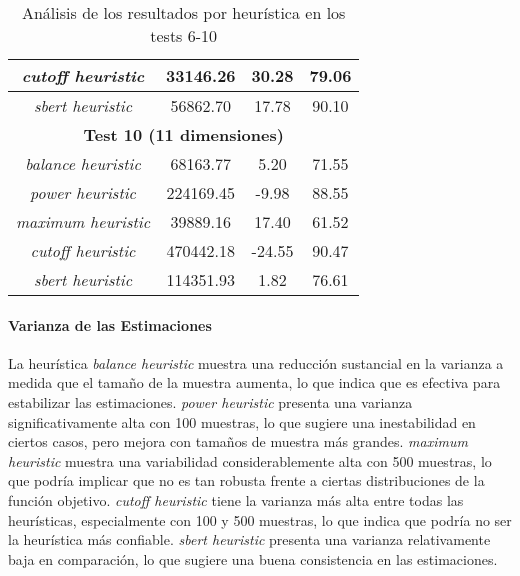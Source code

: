 \documentclass{article}
\begin{document}
\begin{table}[H]
{\begin{tabular}{|c|c|c|c|}
\textit{cutoff heuristic} & 33146.26 & 30.28 & 79.06 \\ \hline
\textit{sbert heuristic} & 56862.70 & 17.78 & 90.10 \\ \hline
\multicolumn{4}{|c|}{\textbf{Test 10 (11 dimensiones)}} \\ \hline
\textit{balance heuristic} & 68163.77 & 5.20 & 71.55 \\ \hline
\textit{power heuristic} & 224169.45 & -9.98 & 88.55 \\ \hline
\textit{maximum heuristic} & 39889.16 & 17.40 & 61.52 \\ \hline
\textit{cutoff heuristic} & 470442.18 & -24.55 & 90.47 \\ \hline
\textit{sbert heuristic} & 114351.93 & 1.82 & 76.61 \\ \hline
\end{tabular}%
}
\caption{Análisis de los resultados por heurística en los tests 6-10}
\end{table}

\begin{table}[H]
\centering
\label{table:heuristic_analysis}
\caption{Análisis de los resultados por heurística}
\end{table}

\paragraph{Varianza de las Estimaciones}
La heurística \textit{balance heuristic} muestra una reducción sustancial en la varianza a medida que el tamaño de la muestra aumenta, lo que indica que es efectiva para estabilizar las estimaciones.
\textit{power heuristic} presenta una varianza significativamente alta con 100 muestras, lo que sugiere una inestabilidad en ciertos casos, pero mejora con tamaños de muestra más grandes.
\textit{maximum heuristic} muestra una variabilidad considerablemente alta con 500 muestras, lo que podría implicar que no es tan robusta frente a ciertas distribuciones de la función objetivo.
\textit{cutoff heuristic} tiene la varianza más alta entre todas las heurísticas, especialmente con 100 y 500 muestras, lo que indica que podría no ser la heurística más confiable.
\textit{sbert heuristic} presenta una varianza relativamente baja en comparación, lo que sugiere una buena consistencia en las estimaciones.
\end{document}

